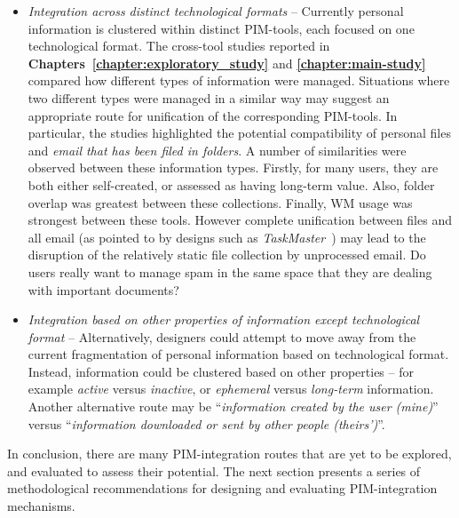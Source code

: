 \begin{itemize}

\item \textit{Integration across distinct technological formats} -- Currently personal information is clustered within distinct PIM-tools, each focused on one technological format.  The cross-tool studies reported in \textbf{Chapters~\ref{chapter:exploratory_study}} and \textbf{\ref{chapter:main-study}} compared how different types of information were managed.  Situations where two different types were managed in a similar way may suggest an appropriate route for unification of the corresponding PIM-tools.  In particular, the studies highlighted the potential compatibility of personal files and \textit{email that has been filed in folders}.  A number of similarities were observed between these information types.  Firstly, for many users, they are both either self-created, or assessed as having long-term value.  Also, folder overlap was greatest between these collections.  Finally, WM usage was strongest between these tools.  
However complete unification between files and all email (as pointed to by designs such as \textit{TaskMaster}~\citep{Bellotti:03}) may lead to the disruption of the relatively static file collection by unprocessed email. Do users really want to manage spam in the same space that they are dealing with important documents? 

\item \textit{Integration based on other properties of information except technological format} -- Alternatively, designers could attempt to move away from the current fragmentation of personal information based on technological format.  Instead, information could be clustered based on other properties   -- for example \textit{active} versus \textit{inactive}, or \textit{ephemeral} versus \textit{long-term} information.  Another alternative route may be ``\textit{information created by the user (mine)}'' versus ``\textit{information downloaded or sent by other people (theirs')}''.

\end{itemize}
In conclusion, there are many PIM-integration routes that are yet to be explored, and evaluated to assess their potential. The next section presents a series of methodological recommendations for designing and evaluating PIM-integration mechanisms.

